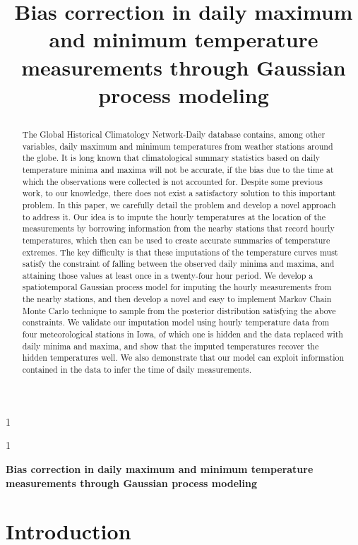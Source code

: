 \documentclass[12pt]{article}
\newcommand{\blind}{1}
\newcommand{\temptitle}{
	Bias correction in daily maximum and minimum temperature measurements through Gaussian process modeling
}
\begin{document}
\blind
{
\title{
    \Large
    \bf
    \temptitle
}
\author{\tempauthors}
\maketitle
} \fi

\blind
{
  \bigskip
  \bigskip
  \bigskip
  \begin{center}
    {\LARGE\bf \temptitle}
\end{center}
  \medskip
} \fi
    
 \begin{abstract}
The Global Historical Climatology Network-Daily database contains, among other variables, daily maximum and minimum temperatures from weather stations around the globe.
It is long known that climatological summary statistics based on daily temperature minima and maxima will not be accurate, if the bias due to the time at which the observations were collected is not accounted for. Despite some previous work, to our knowledge, there does not exist a satisfactory solution to this important problem.
In this paper, we carefully detail the problem and develop a novel approach to address it. Our idea is to impute the hourly temperatures
at the location of the measurements by borrowing information from the nearby stations that record hourly temperatures, which then can be used to create accurate summaries of temperature extremes.
The key difficulty is that these imputations of the temperature curves must satisfy the constraint of falling between the observed daily minima and maxima, and attaining those values at least once in a twenty-four hour period.
We develop a spatiotemporal Gaussian process model for imputing the hourly measurements from the nearby stations, and then develop a novel and easy to implement Markov Chain Monte Carlo technique to sample from the posterior distribution satisfying the above constraints. 
We validate our imputation model using hourly temperature data 
from four meteorological stations in Iowa,
of which one is hidden and the data replaced with daily minima and maxima,
and show that the imputed temperatures recover the hidden temperatures well.
We also demonstrate that our model can exploit information contained in the data to infer the time of daily measurements. 
\end{abstract}

\section{Introduction}\label{sec:introduction}
\end{document}
